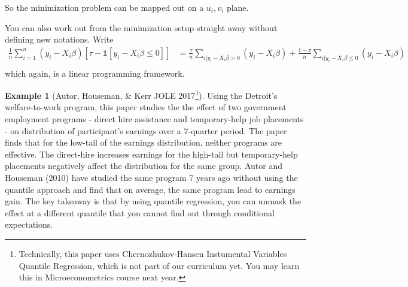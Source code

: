 \documentclass[12pt]{article}
\theoremstyle{definition}
\theoremstyle{property}
\theoremstyle{assumption}
\theoremstyle{example}
\newtheorem{example}{Example}[section]
\theoremstyle{comment}
\begin{document}
So the minimization problem can be mapped out on a $u_i, v_i$ plane. \par
You can also work out from the minimization setup straight away without defining new notations. Write 
\[
\begin{aligned}
\frac{1}{n}\sum_{i=1}^n (y_i-X_i\beta)[\tau-\mathbb{1}[y_i-X_i\beta\leq0]]&=\frac{\tau}{n}\sum_{i|y_i-X_i\beta>0}(y_i-X_i\beta)+\frac{1-\tau}{n}\sum_{i|y_i-X_i\beta\leq0}(y_i-X_i\beta)\\
\end{aligned}
\]which again, is a linear programming framework.

\begin{mdframed}[backgroundcolor=yellow!5] 
\begin{example}[Autor, Houseman, \& Kerr JOLE 2017\footnote{Technically, this paper uses Chernozhukov-Hansen Instumental Variables Quantile Regression, which is not part of our curriculum yet. You may learn this in Microeconometrics course next year.}]
Using the Detroit's welfare-to-work program, this paper studies the the effect of two government employment programs - direct hire assistance and temporary-help job placements - on distribution of participant's earnings over a 7-quarter period. The paper finds that for the low-tail of the earnings distribution, neither programs are effective. The direct-hire increases earnings for the high-tail but temporary-help placements negatively affect the distribution for the same group.  Autor and Houseman (2010) have studied the same program 7 years ago without using the quantile approach and find that on average, the same program lead to earnings gain. The key takeaway is that by using quantile regression, you can unmask the effect at a different quantile that you cannot find out through conditional expectations. 
\end{example}


\end{mdframed}
\end{document}
